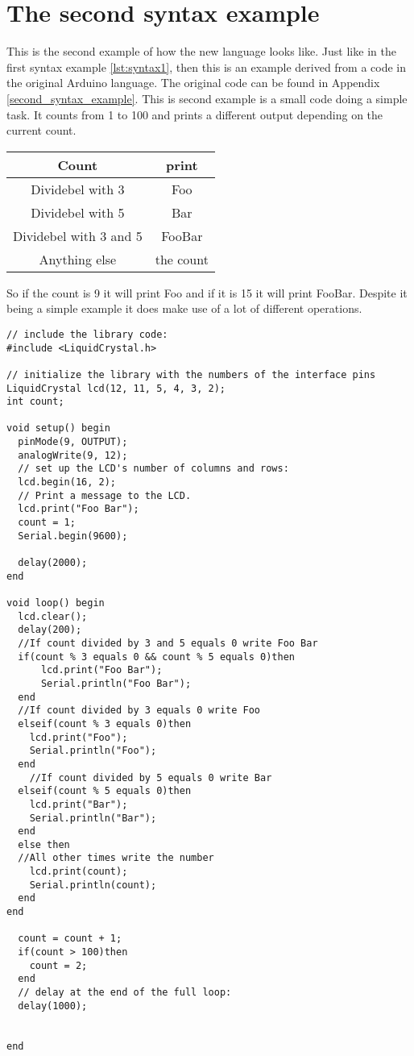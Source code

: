 \section{The second syntax example}
This is the second example of how the new language looks like. Just like in the first syntax example \ref{lst:syntax1}, then this is an example derived from a code in the original Arduino language. The original code can be found in Appendix \ref{second_syntax_example}. This is second example is a small code doing a simple task.
It counts from 1 to 100 and prints a different output depending on the current count.\\
\begin{table}[H]
\centering
\begin{tabular}{|c|c|}
\hline 
Count & print \\ 
\hline 
Dividebel with 3 & Foo \\ 
\hline 
Dividebel with 5 & Bar \\ 
\hline 
Dividebel with 3 and 5 & FooBar \\ 
\hline 
Anything else & the count \\ 
\hline 
\end{tabular} 
\end{table}

So if the count is 9 it will print Foo and if it is 15 it will print FooBar. Despite it being a simple example it does make use of a lot of different operations.

\begin{lstlisting}[caption=LCD code example based on the source language, label=lst:syntax2]
// include the library code:
#include <LiquidCrystal.h>

// initialize the library with the numbers of the interface pins
LiquidCrystal lcd(12, 11, 5, 4, 3, 2);
int count;

void setup() begin
  pinMode(9, OUTPUT);
  analogWrite(9, 12);
  // set up the LCD's number of columns and rows: 
  lcd.begin(16, 2);
  // Print a message to the LCD.
  lcd.print("Foo Bar");
  count = 1;
  Serial.begin(9600);

  delay(2000);
end

void loop() begin
  lcd.clear();
  delay(200);
  //If count divided by 3 and 5 equals 0 write Foo Bar
  if(count % 3 equals 0 && count % 5 equals 0)then
      lcd.print("Foo Bar"); 
      Serial.println("Foo Bar"); 
  end
  //If count divided by 3 equals 0 write Foo 
  elseif(count % 3 equals 0)then
    lcd.print("Foo");
    Serial.println("Foo"); 
  end
    //If count divided by 5 equals 0 write Bar 
  elseif(count % 5 equals 0)then
    lcd.print("Bar");
    Serial.println("Bar"); 
  end
  else then
  //All other times write the number
    lcd.print(count);
    Serial.println(count); 
  end
end

  count = count + 1;
  if(count > 100)then
    count = 2;
  end
  // delay at the end of the full loop:
  delay(1000);


end
\end{lstlisting}
